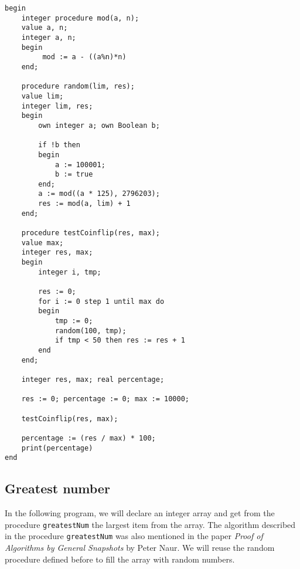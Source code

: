 \documentclass{article}
\begin{document}
\begin{lstlisting}[language={[60]algol}]
begin
    integer procedure mod(a, n);
    value a, n;
    integer a, n;
    begin
         mod := a - ((a%n)*n)
    end;
 
    procedure random(lim, res);
    value lim;
    integer lim, res;
    begin
        own integer a; own Boolean b;
        
        if !b then
        begin
            a := 100001;
            b := true
        end;
        a := mod((a * 125), 2796203);
        res := mod(a, lim) + 1
    end;
    
    procedure testCoinflip(res, max);
    value max;
    integer res, max;
    begin
        integer i, tmp;
        
        res := 0; 
        for i := 0 step 1 until max do
        begin
            tmp := 0;
            random(100, tmp);
            if tmp < 50 then res := res + 1
        end
    end;
    
    integer res, max; real percentage;
    
    res := 0; percentage := 0; max := 10000;
    
    testCoinflip(res, max);
    
    percentage := (res / max) * 100;
    print(percentage)
end    
\end{lstlisting}

\subsection{Greatest number}
In the following program, we will declare an integer array and get from the procedure \texttt{greatestNum} the largest item from the array. The algorithm described in the procedure \texttt{greatestNum} was also mentioned in the paper \textit{Proof of Algorithms by General Snapshots} by Peter Naur. We will reuse the random procedure defined before to fill the array with random numbers.
\end{document}
